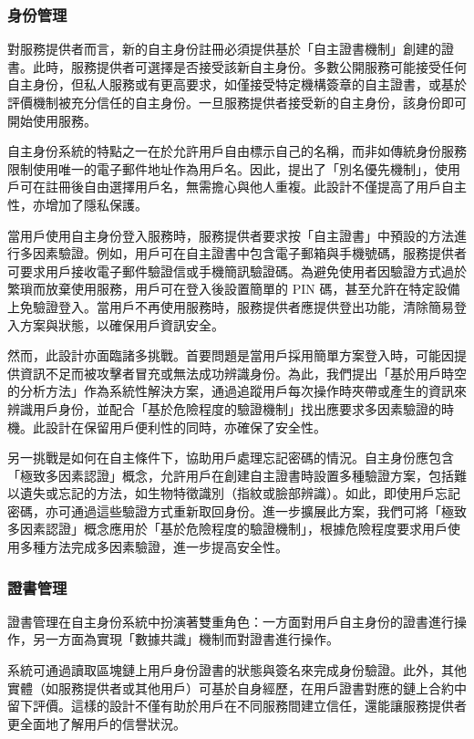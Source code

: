 \subsubsection{身份管理}
對服務提供者而言，新的自主身份註冊必須提供基於「自主證書機制」創建的證書。此時，服務提供者可選擇是否接受該新自主身份。多數公開服務可能接受任何自主身份，但私人服務或有更高要求，如僅接受特定機構簽章的自主證書，或基於評價機制被充分信任的自主身份。一旦服務提供者接受新的自主身份，該身份即可開始使用服務。

自主身份系統的特點之一在於允許用戶自由標示自己的名稱，而非如傳統身份服務限制使用唯一的電子郵件地址作為用戶名。因此，提出了「別名優先機制」，使用戶可在註冊後自由選擇用戶名，無需擔心與他人重複。此設計不僅提高了用戶自主性，亦增加了隱私保護。

當用戶使用自主身份登入服務時，服務提供者要求按「自主證書」中預設的方法進行多因素驗證。例如，用戶可在自主證書中包含電子郵箱與手機號碼，服務提供者可要求用戶接收電子郵件驗證信或手機簡訊驗證碼。為避免使用者因驗證方式過於繁瑣而放棄使用服務，用戶可在登入後設置簡單的 PIN 碼，甚至允許在特定設備上免驗證登入。當用戶不再使用服務時，服務提供者應提供登出功能，清除簡易登入方案與狀態，以確保用戶資訊安全。

然而，此設計亦面臨諸多挑戰。首要問題是當用戶採用簡單方案登入時，可能因提供資訊不足而被攻擊者冒充或無法成功辨識身份。為此，我們提出「基於用戶時空的分析方法」作為系統性解決方案，通過追蹤用戶每次操作時夾帶或產生的資訊來辨識用戶身份，並配合「基於危險程度的驗證機制」找出應要求多因素驗證的時機。此設計在保留用戶便利性的同時，亦確保了安全性。

另一挑戰是如何在自主條件下，協助用戶處理忘記密碼的情況。自主身份應包含「極致多因素認證」概念，允許用戶在創建自主證書時設置多種驗證方案，包括難以遺失或忘記的方法，如生物特徵識別（指紋或臉部辨識）。如此，即使用戶忘記密碼，亦可通過這些驗證方式重新取回身份。進一步擴展此方案，我們可將「極致多因素認證」概念應用於「基於危險程度的驗證機制」，根據危險程度要求用戶使用多種方法完成多因素驗證，進一步提高安全性。
\subsubsection{證書管理}
證書管理在自主身份系統中扮演著雙重角色：一方面對用戶自主身份的證書進行操作，另一方面為實現「數據共識」機制而對證書進行操作。

系統可通過讀取區塊鏈上用戶身份證書的狀態與簽名來完成身份驗證。此外，其他實體（如服務提供者或其他用戶）可基於自身經歷，在用戶證書對應的鏈上合約中留下評價。這樣的設計不僅有助於用戶在不同服務間建立信任，還能讓服務提供者更全面地了解用戶的信譽狀況。

